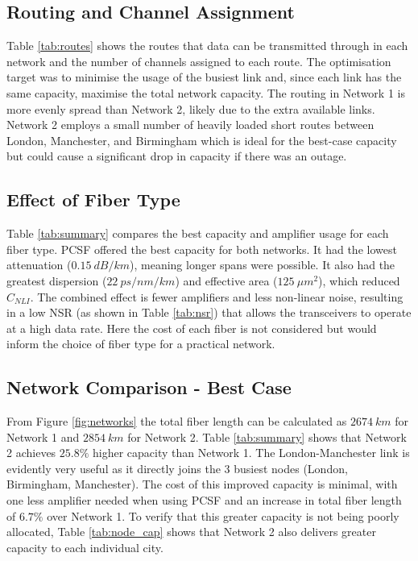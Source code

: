 \documentclass[12pt,a4paper]{article}
\begin{document}
\subsection{Routing and Channel Assignment}
Table \ref{tab:routes} shows the routes that data can be transmitted through in each network and the number of channels assigned to each route. The optimisation target was to minimise the usage of the busiest link and, since each link has the same capacity, maximise the total network capacity. The routing in Network 1 is more evenly spread than Network 2, likely due to the extra available links. Network 2 employs a small number of heavily loaded short routes between London, Manchester, and Birmingham which is ideal for the best-case capacity but could cause a significant drop in capacity if there was an outage.

\subsection{Effect of Fiber Type}
Table \ref{tab:summary} compares the best capacity and amplifier usage for each fiber type. PCSF offered the best capacity for both networks. It had the lowest attenuation (\(0.15 \ dB/km\)), meaning longer spans were possible. It also had the greatest dispersion (\(22 \ ps/nm/km\)) and effective area (\(125 \ \mu m^2\)), which reduced \(C_{NLI}\). The combined effect is fewer amplifiers and less non-linear noise, resulting in a low NSR (as shown in Table \ref{tab:nsr}) that allows the transceivers to operate at a high data rate. Here the cost of each fiber is not considered but would inform the choice of fiber type for a practical network.

\subsection{Network Comparison - Best Case}
From Figure \ref{fig:networks} the total fiber length can be calculated as \(2674 \ km\) for Network 1 and \(2854 \ km\) for Network 2. Table \ref{tab:summary} shows that Network 2 achieves \(25.8\%\) higher capacity than Network 1. The London-Manchester link is evidently very useful as it directly joins the 3 busiest nodes (London, Birmingham, Manchester). The cost of this improved capacity is minimal, with one less amplifier needed when using PCSF and an increase in total fiber length of \(6.7\%\) over Network 1. To verify that this greater capacity is not being poorly allocated, Table \ref{tab:node_cap} shows that Network 2 also delivers greater capacity to each individual city.
\end{document}
